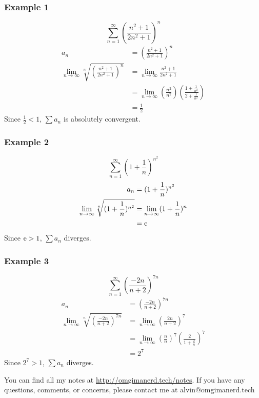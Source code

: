 \documentclass{math}
\begin{document}
\subsubsection*{Example 1}
\[ \sum_{n=1}^{\infty}(\frac{n^{2}+1}{2n^{2}+1})^{n} \]
\begin{align*}
  a_{n} &= (\frac{n^{2}+1}{2n^{2}+1})^{n} \\
  \lim_{n\to\infty}\sqrt[n]{(\frac{n^{2}+1}{2n^{2}+1})^{n}} &=
    \lim_{n\to\infty}\frac{n^{2}+1}{2n^{2}+1} \\
  &= \lim_{n\to\infty}
    (\frac{n^{2}}{n^{2}})(\frac{1+\frac{1}{n^{2}}}{2+\frac{1}{n^{2}}}) \\
  &= \frac{1}{2}
\end{align*}
Since \( \frac{1}{2} < 1 \), \( \sum{a_{n}} \) is absolutely convergent.

\subsubsection*{Example 2}
\[ \sum_{n=1}^{\infty}(1+\frac{1}{n})^{n^{2}} \]
\begin{align*}
  a_{n} &= (1+\frac{1}{n})^{n^{2}} \\
  \lim_{n\to\infty}\sqrt[n]{(1+\frac{1}{n})^{n^{2}}} &=
    \lim_{n\to\infty}(1+\frac{1}{n})^{n} \\
  &= \mathrm{e}
\end{align*}
Since \( \mathrm{e} > 1 \), \( \sum{a_{n}} \) diverges.

\subsubsection*{Example 3}
\[ \sum_{n=1}^{\infty}(\frac{-2n}{n+2})^{7n} \]
\begin{align*}
  a_{n} &= (\frac{-2n}{n+2})^{7n} \\
  \lim_{n\to\infty}\sqrt[n]{(\frac{-2n}{n+2})^{7n}} &=
    \lim_{n\to\infty}(\frac{2n}{n+2})^{7} \\
  &= \lim_{n\to\infty}(\frac{n}{n})^{7}(\frac{2}{1+\frac{2}{n}})^{7} \\
  &= 2^{7}
\end{align*}
Since \( 2^{7} > 1 \), \( \sum{a_{n}} \) diverges.

\begin{center}
  You can find all my notes at \url{http://omgimanerd.tech/notes}. If you have
  any questions, comments, or concerns, please contact me at
  alvin@omgimanerd.tech
\end{center}
\end{document}
